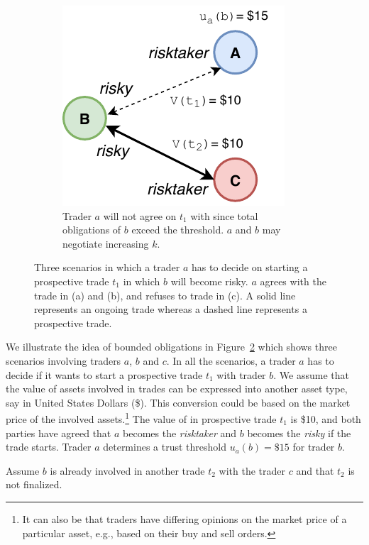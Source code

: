 \begin{figure}[t]
\begin{subfigure}[t]{.4\textwidth}
		\centering
		\captionsetup{width=.9\linewidth}
		\includegraphics[width=.7\linewidth]{xchange/assets/trade_restriction_3}
		\caption{Trader $ a $ will not agree on $ t_1 $ with since total obligations of $ b $ exceed the threshold. $ a $ and $ b $ may negotiate increasing $ k $.}
		\label{fig:trade_restriction_3}
	\end{subfigure}%
	\caption{Three scenarios in which a trader $ a $ has to decide on starting a prospective trade $ t_1 $ in which $ b $ will become risky. $ a $ agrees with the trade in (a) and (b), and refuses to trade in (c). A solid line represents an ongoing trade whereas a dashed line represents a prospective trade.}
	\label{fig:trade_rules}
\end{figure}

We illustrate the idea of bounded obligations in Figure~\ref{fig:trade_rules} which shows three scenarios involving traders $ a $, $ b $ and $ c $.  
In all the scenarios, a trader $ a $ has to decide if it wants to start a prospective trade $ t_1 $ with trader $ b $.
We assume that the value of assets involved in trades can be expressed into another asset type, say in United States Dollars (\$).
This conversion could be based on the market price of the involved assets.\footnote{It can also be that traders have differing opinions on the market price of a particular asset, e.g., based on their buy and sell orders.}
The value of \MarginalStake{} in prospective trade $ t_1 $ is \$10, and both parties have agreed that $ a $ becomes the \emph{risktaker} and $ b $ becomes the \emph{risky} if the trade starts.
Trader $ a $ determines a trust threshold $ u_a(b) = \$15 $ for trader $ b $.

Assume $ b $ is already involved in another trade $ t_2 $ with the trader $ c $ and that $ t_2 $ is not finalized.

